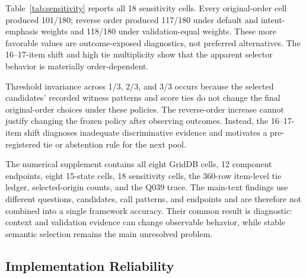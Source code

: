 \documentclass[applsci,article,submit,moreauthors]{Definitions/mdpi}
\begin{document}
Table~\ref{tab:sensitivity} reports all 18 sensitivity cells. Every original-order cell produced 101/180; reverse order produced 117/180 under default and intent-emphasis weights and 118/180 under validation-equal weights. These more favorable values are outcome-exposed diagnostics, not preferred alternatives. The 16--17-item shift and high tie multiplicity show that the apparent selector behavior is materially order-dependent.

Threshold invariance across 1/3, 2/3, and 3/3 occurs because the selected candidates' recorded witness patterns and score ties do not change the final original-order choices under these policies. The reverse-order increase cannot justify changing the frozen policy after observing outcomes. Instead, the 16--17-item shift diagnoses inadequate discriminative evidence and motivates a pre-registered tie or abstention rule for the next pool.

\begin{table}[htbp]
\caption{Complete-witness selector sensitivity summarized across invariant-pass thresholds. Results were identical at 1/3, 2/3, and 3/3 for every weight/order pair; coverage was 180/180 throughout.}
\label{tab:sensitivity}
\centering
\small
{}
\end{table}

The numerical supplement contains all eight GridDB cells, 12 component endpoints, eight 15-state cells, 18 sensitivity cells, the 360-row item-level tie ledger, selected-origin counts, and the Q039 trace. The main-text findings use different questions, candidates, call patterns, and endpoints and are therefore not combined into a single framework accuracy. Their common result is diagnostic: context and validation evidence can change observable behavior, while stable semantic selection remains the main unresolved problem.

\subsection{Implementation Reliability}
\end{document}
